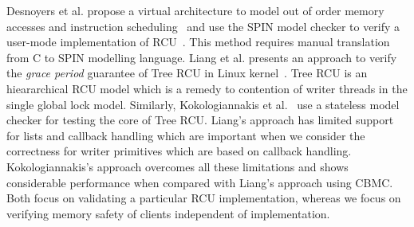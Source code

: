 Desnoyers et al. propose a virtual architecture to model out of order memory accesses and instruction scheduling~\cite{Desnoyers:2013:MSM:2506164.2506174} and use the \textsf{SPIN} model checker to verify a user-mode implementation of RCU~\cite{urcu_ieee}. This method requires manual translation from C to SPIN modelling language.
Liang et al. presents an approach to verify the \emph{grace period} guarantee of \textsf{Tree RCU} in Linux kernel~\cite{LiangMKM16}. \textsf{Tree RCU} is an hieararchical \textsf{RCU} model which is a remedy to contention of writer threads in the single global lock model. 
Similarly, Kokologiannakis et al.~\cite{Kokologiannakis:2017:SMC:3092282.3092287} use a stateless model checker for testing the core of \textsf{Tree RCU}.
Liang's approach has limited support for lists and callback handling which are important when we consider the correctness for writer primitives which are based on callback handling. Kokologiannakis's approach overcomes all these limitations and shows considerable performance when compared with Liang's approach using \textsf{CBMC}. 
Both focus on validating a particular RCU implementation, whereas we focus on verifying memory safety of clients independent of implementation.
  
